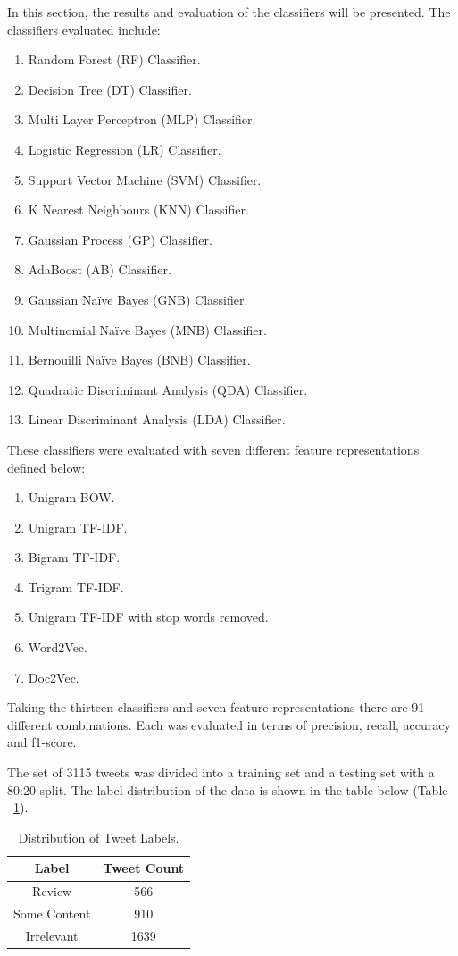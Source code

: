 In this section, the results and evaluation of the classifiers will be presented. The classifiers evaluated include:
\begin{enumerate}
    \item Random Forest (RF) Classifier.
    \item Decision Tree (DT) Classifier.
    \item Multi Layer Perceptron (MLP) Classifier.
    \item Logistic Regression (LR) Classifier.    
    \item Support Vector Machine (SVM) Classifier.
    \item K Nearest Neighbours (KNN) Classifier.
    \item Gaussian Process (GP) Classifier.
    \item AdaBoost (AB) Classifier.
    \item Gaussian Naïve Bayes (GNB) Classifier.
    \item Multinomial Naïve Bayes (MNB) Classifier.
    \item Bernouilli Naïve Bayes (BNB) Classifier.
    \item Quadratic Discriminant Analysis (QDA) Classifier.
    \item Linear Discriminant Analysis (LDA) Classifier.
\end{enumerate}

These classifiers were evaluated with seven different feature representations defined below:
\begin{enumerate}
    \item Unigram BOW.
    \item Unigram TF-IDF.
    \item Bigram TF-IDF.
    \item Trigram TF-IDF.
    \item Unigram TF-IDF with stop words removed.
    \item Word2Vec.
    \item Doc2Vec.
\end{enumerate}

Taking the thirteen classifiers and seven feature representations there are 91 different combinations. Each was evaluated in terms of precision, recall, accuracy and f1-score.

The set of 3115 tweets was divided into a training set and a testing set with a 80:20 split. The label distribution of the data is shown in the table below (Table ~\ref{Table:tweetlabels}).

\begin{table}[h!]
\setlength\extrarowheight{5pt}
\caption{Distribution of Tweet Labels.}
\label{Table:tweetlabels}
\begin{tabular}{|c|c|}
\hline
\textbf{Label} & \textbf{Tweet Count} \\ \hline
Review         & 566                  \\ \hline
Some Content   & 910                  \\ \hline
Irrelevant     & 1639                 \\ \hline
\end{tabular}
\end{table}

